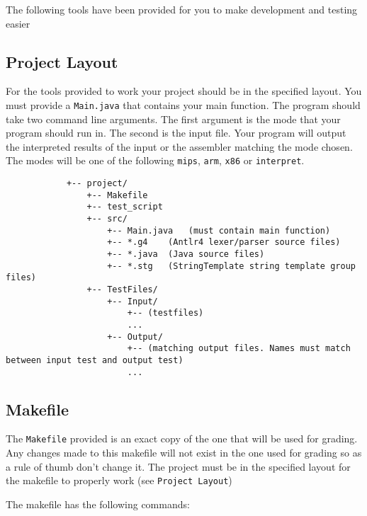 \documentclass{article}
\begin{document}
	The following tools have been provided for you to make development and testing easier

	\subsection{Project Layout}

		For the tools provided to work your project should be in the specified layout. You must provide a \texttt{Main.java} that contains your main function. The program should take two command line arguments. The first argument is the mode that your program should run in. The second is the input file. Your program will output the interpreted results of the input or the assembler matching the mode chosen. The modes will be one of the following \texttt{mips}, \texttt{arm}, \texttt{x86} or \texttt{interpret}.

		\begin{lstlisting}
			+-- project/
				+-- Makefile
				+-- test_script
				+-- src/
					+-- Main.java	(must contain main function)
					+-- *.g4	(Antlr4 lexer/parser source files)
					+-- *.java	(Java source files)
					+-- *.stg	(StringTemplate string template group files)
				+-- TestFiles/
					+-- Input/
						+-- (testfiles)
						...
					+-- Output/
						+-- (matching output files. Names must match between input test and output test)
						...
		\end{lstlisting}


	\subsection{Makefile}

		The \texttt{Makefile} provided is an exact copy of the one that will be used for grading.  Any changes made to
		this makefile will not exist in the one used for grading so as a rule of thumb don't change it. The project must
		be in the specified layout for the makefile to properly work (see \texttt{Project Layout})

		The makefile has the following commands:
\end{document}
